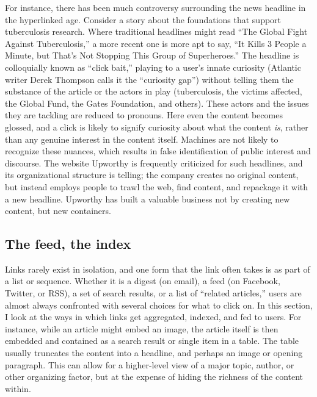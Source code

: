 For instance, there has been much controversy surrounding the news headline in the hyperlinked age. Consider a story about the foundations that support tuberculosis research. Where traditional headlines might read ``The Global Fight Against Tuberculosis,'' a more recent one is more apt to say, ``It Kills 3 People a Minute, but That's Not Stopping This Group of Superheroes.''\autocite{find upworthy ref} The headline is colloquially known as ``click bait,'' playing to a user's innate curiosity (Atlantic writer Derek Thompson calls it the ``curiosity gap'')\autocite{thompson_upworthy:_2013} without telling them the substance of the article or the actors in play (tuberculosis, the victims affected, the Global Fund, the Gates Foundation, and others). These actors and the issues they are tackling are reduced to pronouns. Here even the content becomes glossed, and a click is likely to signify curiosity about what the content \emph{is}, rather than any genuine interest in the content itself. Machines are not likely to recognize these nuances, which results in false identification of public interest and discourse. The website Upworthy is frequently criticized for such headlines, and its organizational structure is telling; the company creates no original content, but instead employs people to trawl the web, find content, and repackage it with a new headline. Upworthy has built a valuable business not by creating new content, but new containers.

\subsection{The feed, the index}

Links rarely exist in isolation, and one form that the link often takes is as part of a list or sequence. Whether it is a digest (on email), a feed (on Facebook, Twitter, or RSS), a set of search results, or a list of ``related articles,'' users are almost always confronted with several choices for what to click on. In this section, I look at the ways in which links get aggregated, indexed, and fed to users. For instance, while an article might embed an image, the article itself is then embedded and contained as a search result or single item in a table. The table usually truncates the content into a headline, and perhaps an image or opening paragraph. This can allow for a higher-level view of a major topic, author, or other organizing factor, but at the expense of hiding the richness of the content within.

